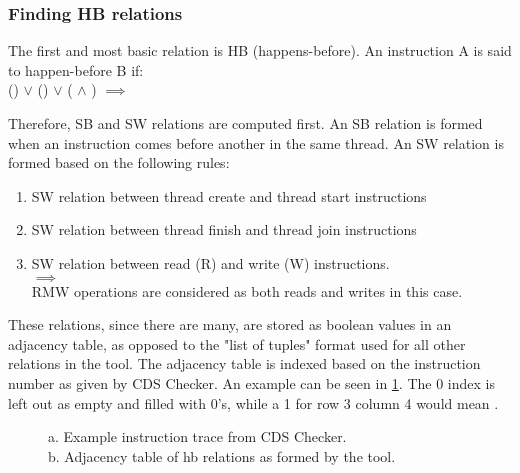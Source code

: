 \subsubsection{Finding HB relations}
The first and most basic relation is HB (happens-before). An instruction A is said to happen-before B if:\\
() $\lor$ () $\lor$ ( $\land$ ) $\implies$ 

\par
Therefore, SB and SW relations are computed first. An SB relation is formed when an instruction comes before another in the same thread. An SW relation is formed based on the following rules:
\begin{enumerate}
\item SW relation between thread create and thread start instructions\\

\item SW relation between thread finish and thread join instructions\\

\item SW relation between read (R) and write (W) instructions.\\
 $\implies$ \\
RMW operations are considered as both reads and writes in this case.
\end{enumerate}

\par
These relations, since there are many, are stored as boolean values in an adjacency table, as opposed to the "list of tuples" format used for all other relations in the tool. The adjacency table is indexed based on the instruction number as given by CDS Checker. An example can be seen in \ref{fig:cds_hb}. The 0 index is left out as empty and filled with 0's, while a 1 for row 3 column 4 would mean .

\begin{figure}
\begin{center}
	
	\caption{a. Example instruction trace from CDS Checker.\\b. Adjacency table of hb relations as formed by the tool.}
	\label{fig:cds_hb}
\end{center}
\end{figure}

